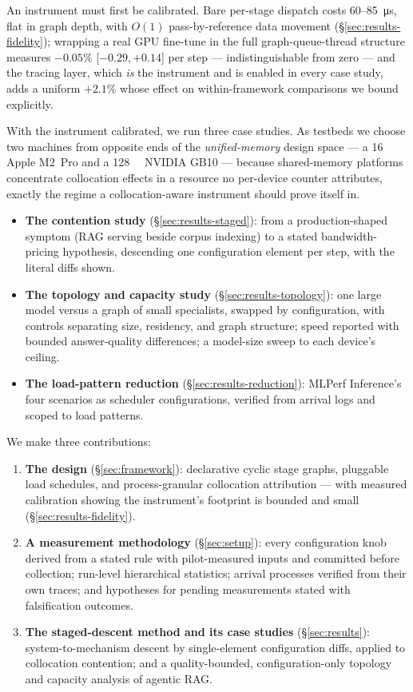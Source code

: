 An instrument must first be calibrated. Bare per-stage dispatch costs
\SI{60}{}--\SI{85}{\micro\second}, flat in graph depth, with $O(1)$
pass-by-reference data movement (\S\ref{sec:results-fidelity}); wrapping a
real GPU fine-tune in the full graph-queue-thread structure measures
$-0.05\%$ [$-0.29,+0.14$] per step --- indistinguishable from zero --- and
the tracing layer, which \emph{is} the instrument and is enabled in every
case study, adds a uniform $+2.1\%$ whose effect on within-framework
comparisons we bound explicitly.

With the instrument calibrated, we run three case studies. As testbeds we choose two machines from
opposite ends of the \emph{unified-memory} design space --- a
\SI{16}{\giga\byte} Apple M2~Pro and a \SI{128}{\giga\byte} NVIDIA GB10 ---
because shared-memory platforms concentrate collocation effects in a
resource no per-device counter attributes, exactly the regime a
collocation-aware instrument should prove itself in.

\begin{itemize}
  \item \textbf{The contention study} (\S\ref{sec:results-staged}):
  from a production-shaped symptom (RAG serving beside corpus indexing) to
  a stated bandwidth-pricing hypothesis, descending one configuration
  element per step, with the literal diffs shown.
  \item \textbf{The topology and capacity study}
  (\S\ref{sec:results-topology}): one large model versus a graph of small
  specialists, swapped by configuration, with controls separating size,
  residency, and graph structure; speed reported with bounded answer-quality
  differences; a model-size sweep to each device's ceiling.
  \item \textbf{The load-pattern reduction}
  (\S\ref{sec:results-reduction}): MLPerf Inference's four scenarios as
  scheduler configurations, verified from arrival logs and scoped to load
  patterns.
\end{itemize}

\noindent We make three contributions:
\begin{enumerate}
  \item \textbf{The \sysname{} design} (\S\ref{sec:framework}): declarative
  cyclic stage graphs, pluggable load schedules, and process-granular
  collocation attribution --- with measured calibration showing the
  instrument's footprint is bounded and small
  (\S\ref{sec:results-fidelity}).
  \item \textbf{A measurement methodology} (\S\ref{sec:setup}): every
  configuration knob derived from a stated rule with pilot-measured inputs
  and committed before collection; run-level hierarchical statistics;
  arrival processes verified from their own traces; and hypotheses for
  pending measurements stated with falsification outcomes.
  \item \textbf{The staged-descent method and its case studies}
  (\S\ref{sec:results}): system-to-mechanism descent by single-element
  configuration diffs, applied to collocation contention; and a
  quality-bounded, configuration-only topology and capacity analysis of
  agentic RAG.
\end{enumerate}
